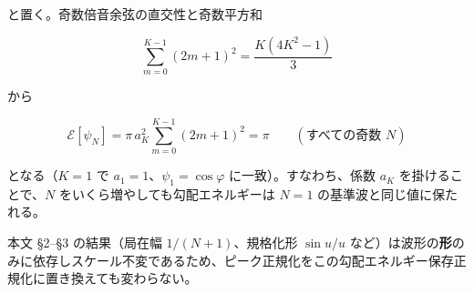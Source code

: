 \documentclass[
]{ltjsarticle}
\begin{document}
と置く。奇数倍音余弦の直交性と奇数平方和

\[
\sum_{m=0}^{K-1}(2m+1)^2=\frac{K(4K^2-1)}{3}
\]

から

\[
\mathcal{E}[\psi_N]=\pi\,a_K^2\sum_{m=0}^{K-1}(2m+1)^2=\pi
\qquad(\text{すべての奇数 }N)
\]

となる（\(K=1\) で \(a_1=1\)、\(\psi_1=\cos\varphi\)
に一致）。すなわち、係数 \(a_K\) を掛けることで、\(N\)
をいくら増やしても勾配エネルギーは \(N=1\) の基準波と同じ値に保たれる。

本文 §2--§3 の結果（局在幅 \(1/(N+1)\)、規格化形 \(\sin u/u\)
など）は波形の\textbf{形}のみに依存しスケール不変であるため、ピーク正規化をこの勾配エネルギー保存正規化に置き換えても変わらない。
\end{document}
